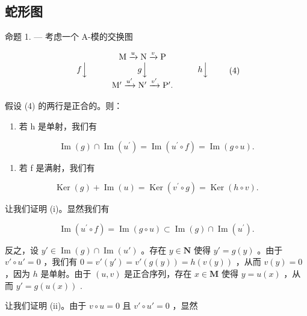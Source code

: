 \subsection{蛇形图}

命题 1. --- 考虑一个 A-模的交换图

\[
\begin{array}{c} \mathrm{M} \xrightarrow {u} \mathrm{N} \xrightarrow {v} \mathrm{P} \\ f \Big \downarrow \qquad \qquad \qquad g \Big \downarrow \qquad \qquad \qquad h \Big \downarrow \\ \mathrm{M} ^ {\prime} \xrightarrow {u ^ {\prime}} \mathrm{N} ^ {\prime} \xrightarrow {v ^ {\prime}} \mathrm{P} ^ {\prime}. \end{array}\tag{4}
\]

假设 (4) 的两行是正合的。则：

\begin{enumerate}
\def\labelenumi{(\roman{enumi})}
\tightlist
\item
  若 h 是单射，我们有
\end{enumerate}

\[
\operatorname{Im} (g) \cap \operatorname{Im} \left(u ^ {\prime}\right) = \operatorname{Im} \left(u ^ {\prime} \circ f\right) = \operatorname{Im} (g \circ u).\tag{5}
\]

\begin{enumerate}
\def\labelenumi{(\roman{enumi})}
\setcounter{enumi}{1}
\tightlist
\item
  若 f 是满射，我们有
\end{enumerate}

\[
\operatorname{Ker} (g) + \operatorname{Im} (u) = \operatorname{Ker} \left(v ^ {\prime} \circ g\right) = \operatorname{Ker} (h \circ v).\tag{6}
\]

让我们证明 (i)。显然我们有

\[
\operatorname{Im} \left(u ^ {\prime} \circ f\right) = \operatorname{Im} (g \circ u) \subset \operatorname{Im} (g) \cap \operatorname{Im} \left(u ^ {\prime}\right).
\]

反之，设 \(y' \in \operatorname{Im}(g) \cap \operatorname{Im}(u')\) 。存在 \(y \in \mathbf{N}\) 使得 \(y' = g(y)\) 。由于 \(v' \circ u' = 0\) ，我们有 \(0 = v'(y') = v'(g(y)) = h(v(y))\) ，从而 \(v(y) = 0\) ，因为 \(h\) 是单射。由于 \((u, v)\) 是正合序列，存在 \(x \in \mathbf{M}\) 使得 \(y = u(x)\) ，从而 \(y' = g(u(x))\) .

让我们证明 (ii)。由于 \(v \circ u = 0\) 且 \(v' \circ u' = 0\) ，显然

